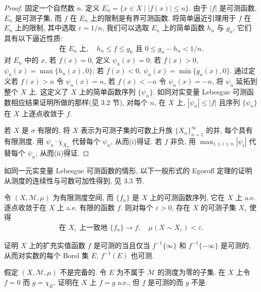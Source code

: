 \documentclass[../../main.tex]{subfiles}
\begin{document}
\begin{proof}
固定一个自然数 $n$. 定义 $E_{n}=\{x\in X\mid|f(x)|\leqslant n\}$. 由于 $|f|$ 是可测函数, $E_{n}$ 是可测子集, 而 $f$ 在 $E_{n}$ 上的限制是有界可测函数. 将简单逼近引理用于 $f$ 在 $E_{n}$ 上的限制, 其中选取 $\varepsilon=1/n$, 我们可以选取 $E_{n}$ 上的简单函数 $h_{n}$ 与 $g_{n}$, 它们具有以下逼近性质:
\begin{align*}
\text{在 }E_{n}\text{ 上},\quad h_{n}\leqslant f\leqslant g_{n}\text{ 且 }0\leqslant g_{n}-h_{n}<1/n.
\end{align*}
对 $E_{n}$ 中的 $x$, 若 $f(x)=0$, 定义 $\psi_{n}(x)=0$; 若 $f(x)>0$, $\psi_{n}(x)=\max\{h_{n}(x),0\}$; 若 $f(x)<0$, $\psi_{n}(x)=\min\{g_{n}(x),0\}$. 通过定义若 $f(x)>n$ 令 $\psi_{n}(x)=n$, 若 $f(x)<-n$ 令 $\psi_{n}(x)=-n$, 将 $\psi_{n}$ 延拓到整个 $X$ 上. 这定义了 $X$ 上的简单函数序列 $\{\psi_{n}\}$. 如同对实变量 Lebesgue 可测函数相应结果证明所做的那样(见 3.2 节), 对每个 $n$, 在 $X$ 上, $|\psi_{n}|\leqslant|f|$ 且序列 $\{\psi_{n}\}$ 在 $X$ 上逐点收敛于 $f$.

若 $X$ 是 $\sigma$ 有限的, 将 $X$ 表示为可测子集的可数上升族 $\{X_{n}\}_{n=1}^{\infty}$ 的并, 每个具有有限测度. 用 $\psi_{n}\cdot\chi_{X_{n}}$ 代替每个 $\psi_{n}$, 从而(i)得证. 若 $f$ 非负, 用 $\max_{1\leqslant i\leqslant n}|\psi_{i}|$ 代替每个 $\psi_{n}$, 从而(ii)得证.
\end{proof}

如同一元实变量 Lebesgue 可测函数的情形, 以下一般形式的 Egoroff 定理的证明从测度的连续性与可数可加性得到, 见 3.3 节.

\begin{theorem}[Egoroff]\label{theorem:ch18-egoroff}
令 $(X,\mathcal{M},\mu)$ 为有限测度空间, 而 $\{f_{n}\}$ 是 $X$ 上的可测函数序列, 它在 $X$ 上 a.e. 逐点收敛于在 $X$ 上 a.e. 有限的函数 $f$. 则对每个 $\varepsilon>0$, 存在 $X$ 的可测子集 $X_{\varepsilon}$ 使得
\begin{align*}
\text{在 }X_{\varepsilon}\text{ 上一致地 }\{f_{n}\}\to f,\quad\mu(X\sim X_{\varepsilon})<\varepsilon.
\end{align*}
\end{theorem}

\begin{exercise}\label{exercise:ch18-01}
证明 $X$ 上的扩充实值函数 $f$ 是可测的当且仅当 $f^{-1}\{\infty\}$ 和 $f^{-1}\{-\infty\}$ 是可测的, 从而对实数的每个 Borel 集 $E$, $f^{-1}(E)$ 也可测.
\end{exercise}

\begin{exercise}\label{exercise:ch18-02}
假定 $(X,\mathcal{M},\mu)$ 不是完备的. 令 $E$ 为不属于 $\mathcal{M}$ 的测度为零的子集. 在 $X$ 上令 $f=0$ 而 $g=\chi_{E}$. 证明在 $X$ 上 $f=g$ a.e., 但 $f$ 是可测的而 $g$ 不是.
\end{exercise}
\end{document}
